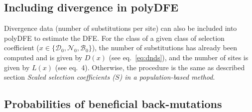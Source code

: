 \documentclass[12pt]{article}
\newcommand{\SphyDel}{\mathcal{D}_0}
\newcommand{\SphyNeu}{\mathcal{N}_0}
\newcommand{\SphyBen}{\mathcal{B}_0}
\newcommand{\Sphyclass}{x}
\newcommand{\Spop}{S}
\begin{document}
    \subsection{Including divergence in polyDFE}
    Divergence data (number of substitutions per site) can also be included into polyDFE to estimate the DFE.
    For the class of a given class of selection coefficient ($\Sphyclass \in \{\SphyDel, \SphyNeu, \SphyBen \}$), the number of substitutions has already been computed and is given by $D\left( \Sphyclass \right)$ (see eq.~\ref{eq:dnds}), and the number of sites is given by $L \left( \Sphyclass \right)$ (see eq.~4).
    Otherwise, the procedure is the same as described section \textit{Scaled selection coefficients ($\Spop$) in a population-based method}.

    \subsection{Probabilities of beneficial back-mutations}
\end{document}
